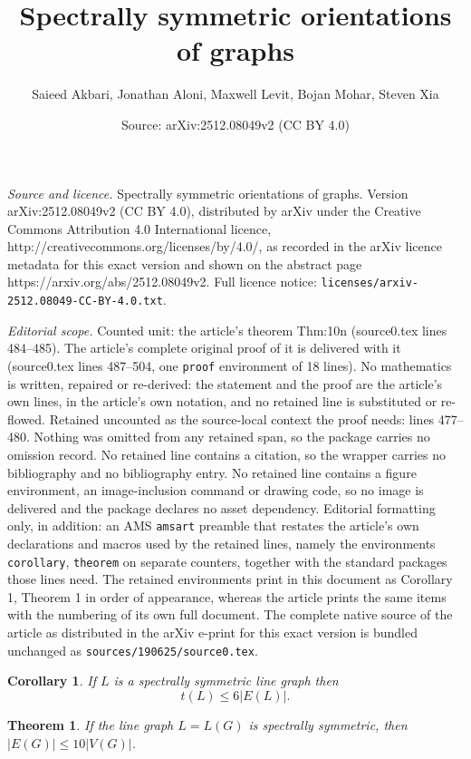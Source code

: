 \documentclass[10pt,a4paper]{amsart}
\title{Spectrally symmetric orientations of graphs}
\author{Saieed Akbari, Jonathan Aloni, Maxwell Levit, Bojan Mohar, Steven Xia}
\date{Source: arXiv:2512.08049v2 (CC BY 4.0)}
\newtheorem{corollary}{Corollary}
\newtheorem{theorem}{Theorem}
\newcommand{\ssym}[0]{spectrally symmetric }
\newcommand{\ssymend}[0]{spectrally symmetric}
\begin{document}
\maketitle

\noindent\emph{Source and licence.} Spectrally symmetric orientations of graphs. Version arXiv:2512.08049v2 (CC BY 4.0), distributed by arXiv under the Creative Commons Attribution 4.0 International licence, http://creativecommons.org/licenses/by/4.0/, as recorded in the arXiv licence metadata for this exact version and shown on the abstract page https://arxiv.org/abs/2512.08049v2. Full licence notice: \texttt{licenses/arxiv-2512.08049-CC-BY-4.0.txt}.\par\smallskip

\noindent\textit{Editorial scope.} Counted unit: the article's theorem Thm:10n (source0.tex lines 484--485). The article's complete original proof of it is delivered with it (source0.tex lines 487--504, one \texttt{proof} environment of 18 lines). No mathematics is written, repaired or re-derived: the statement and the proof are the article's own lines, in the article's own notation, and no retained line is substituted or re-flowed.  Retained uncounted as the source-local context the proof needs: lines 477--480.  Nothing was omitted from any retained span, so the package carries no omission record.  No retained line contains a citation, so the wrapper carries no bibliography and no bibliography entry.  No retained line contains a figure environment, an image-inclusion command or drawing code, so no image is delivered and the package declares no asset dependency.  Editorial formatting only, in addition: an AMS \texttt{amsart} preamble that restates the article's own declarations and macros used by the retained lines, namely the environments \texttt{corollary}, \texttt{theorem} on separate counters, together with the standard packages those lines need.  The retained environments print in this document as Corollary 1, Theorem 1 in order of appearance, whereas the article prints the same items with the numbering of its own full document.  The complete native source of the article as distributed in the arXiv e-print for this exact version is bundled unchanged as \texttt{sources/190625/source0.tex}.
\begin{corollary}\label{Cor:t<6e}
If $L$ is a \ssym line graph then
\[t(L)\le6|E(L)|.\]  
\end{corollary}

\begin{theorem}\label{Thm:10n}
    If the line graph $L=L(G)$ is \ssymend, then $|E(G)|\le10|V(G)|$.\end{theorem}
\end{document}
